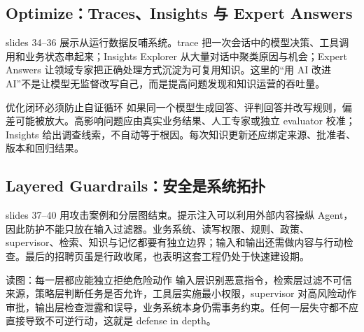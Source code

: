 \subsection{Optimize：Traces、Insights 与 Expert Answers}

slides 34--36 展示从运行数据反哺系统。trace 把一次会话中的模型决策、工具调用和业务状态串起来；Insights Explorer 从大量对话中聚类原因与机会；Expert Answers 让领域专家把正确处理方式沉淀为可复用知识。这里的“用 AI 改进 AI”不是让模型无监督改写自己，而是提高问题发现和知识运营的吞吐量。


\begin{warningbox}{优化闭环必须防止自证循环}
如果同一个模型生成回答、评判回答并改写规则，偏差可能被放大。高影响问题应由真实业务结果、人工专家或独立 evaluator 校准；Insights 给出调查线索，不自动等于根因。每次知识更新还应绑定来源、批准者、版本和回归结果。
\end{warningbox}

\subsection{Layered Guardrails：安全是系统拓扑}

slides 37--40 用攻击案例和分层图结束。提示注入可以利用外部内容操纵 Agent，因此防护不能只放在输入过滤器。业务系统、读写权限、规则、政策、supervisor、检索、知识与记忆都要有独立边界；输入和输出还需做内容与行动检查。最后的招聘页虽是行政收尾，也表明这套工程仍处于快速建设期。


\begin{knowledgebox}{读图：每一层都应能独立拒绝危险动作}
输入层识别恶意指令，检索层过滤不可信来源，策略层判断任务是否允许，工具层实施最小权限，supervisor 对高风险动作审批，输出层检查泄露和误导，业务系统本身仍需事务约束。任何一层失守都不应直接导致不可逆行动，这就是 defense in depth。
\end{knowledgebox}

